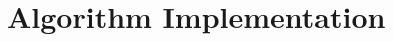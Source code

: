 \documentclass[conference]{IEEEtran}
\begin{document}
{\begin{enumerate}[A)]
  \end{enumerate}

\section{Algorithm Implementation}
\label{algoimple}



}
\end{document}
